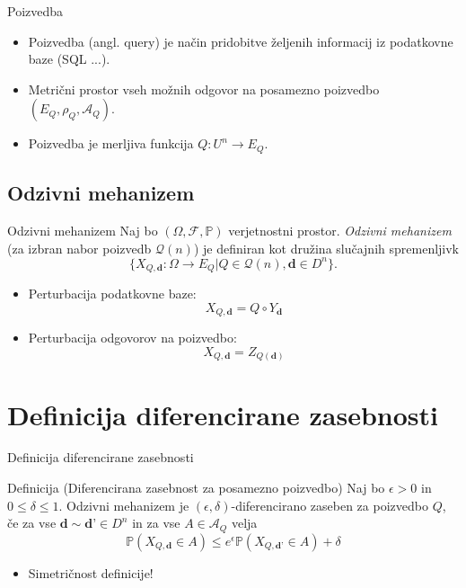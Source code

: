\documentclass{beamer}
\begin{document}
\begin{frame}{Poizvedba}
\begin{itemize}
\item Poizvedba (angl. query) je način pridobitve željenih informacij iz podatkovne baze (SQL ...).
\item Metrični prostor vseh možnih odgovor na posamezno poizvedbo  $(E_{Q}, \rho_{Q}, \mathcal{A}_{Q})$.
\item  Poizvedba je merljiva funkcija $Q: U^n \rightarrow E_{Q} $.
\end{itemize}
\end{frame}

\subsection{Odzivni mehanizem}

\begin{frame}{Odzivni mehanizem}
Naj bo $(\Omega , \mathcal{F}, \mathbb {P} )$ verjetnostni prostor. \textit{Odzivni mehanizem} (za izbran nabor poizvedb $\mathcal{Q}(n)$) je definiran kot družina slučajnih spremenljivk
\begin{equation}\label{odzivni}
 \{X_{Q,\textbf{d}} : \Omega \rightarrow  E_{Q} | Q \in  \mathcal{Q} (n), \textbf{d} \in D^n\} \tag{1}.
\end{equation} 
\begin{itemize}
\item Perturbacija podatkovne baze: 
\begin{equation}\label{odzivni2}
 X_{Q,\textbf{d}} = Q \circ Y_{\textbf{d}} \tag{2}
\end{equation} 
\item Perturbacija odgovorov na poizvedbo:
\begin{equation}\label{odzivni3}
X_{Q,\textbf{d}}=Z_{Q(\textbf{d})}\tag{3}
\end{equation} 
\end{itemize}
\end{frame}

\section{Definicija diferencirane zasebnosti}

\begin{frame}{Definicija diferencirane zasebnosti}
\begin{block}{Definicija (Diferencirana zasebnost za posamezno poizvedbo)}
Naj bo $\epsilon > 0$ in $0 \leq \delta \leq 1 $. Odzivni mehanizem je $(\epsilon, \delta)$-diferencirano zaseben za poizvedbo $Q$, če za vse $\textbf{d} \sim \textbf{d'} \in D^n$  in za vse $A\in\mathcal{A}_{Q}$ velja 
\begin{equation}\label{diferen}
\mathbb{P}(X_{Q,\textbf{d}} \in A) \leq e^\epsilon \mathbb{P}(X_{Q,\textbf{d'}} \in A) + \delta \tag{4}
\end{equation}
\end{block}
\begin{itemize}
\item Simetričnost definicije!
\end{itemize}
\end{frame}
\end{document}
